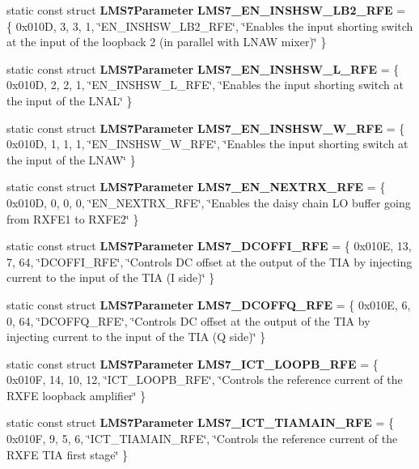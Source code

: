 \begin{DoxyCompactItemize}
static const struct {\bf L\+M\+S7\+Parameter} {\bf L\+M\+S7\+\_\+\+E\+N\+\_\+\+I\+N\+S\+H\+S\+W\+\_\+\+L\+B2\+\_\+\+R\+FE} = \{ 0x010\+D, 3, 3, 1, \char`\"{}\+E\+N\+\_\+\+I\+N\+S\+H\+S\+W\+\_\+\+L\+B2\+\_\+\+R\+F\+E\char`\"{}, \char`\"{}\+Enables the input shorting switch at the input of the loopback 2 (in parallel with L\+N\+A\+W mixer)\char`\"{} \}
\item 
static const struct {\bf L\+M\+S7\+Parameter} {\bf L\+M\+S7\+\_\+\+E\+N\+\_\+\+I\+N\+S\+H\+S\+W\+\_\+\+L\+\_\+\+R\+FE} = \{ 0x010\+D, 2, 2, 1, \char`\"{}\+E\+N\+\_\+\+I\+N\+S\+H\+S\+W\+\_\+\+L\+\_\+\+R\+F\+E\char`\"{}, \char`\"{}\+Enables the input shorting switch at the input of the L\+N\+A\+L\char`\"{} \}
\item 
static const struct {\bf L\+M\+S7\+Parameter} {\bf L\+M\+S7\+\_\+\+E\+N\+\_\+\+I\+N\+S\+H\+S\+W\+\_\+\+W\+\_\+\+R\+FE} = \{ 0x010\+D, 1, 1, 1, \char`\"{}\+E\+N\+\_\+\+I\+N\+S\+H\+S\+W\+\_\+\+W\+\_\+\+R\+F\+E\char`\"{}, \char`\"{}\+Enables the input shorting switch at the input of the L\+N\+A\+W\char`\"{} \}
\item 
static const struct {\bf L\+M\+S7\+Parameter} {\bf L\+M\+S7\+\_\+\+E\+N\+\_\+\+N\+E\+X\+T\+R\+X\+\_\+\+R\+FE} = \{ 0x010\+D, 0, 0, 0, \char`\"{}\+E\+N\+\_\+\+N\+E\+X\+T\+R\+X\+\_\+\+R\+F\+E\char`\"{}, \char`\"{}\+Enables the daisy chain L\+O buffer going from R\+X\+F\+E1 to R\+X\+F\+E2\char`\"{} \}
\item 
static const struct {\bf L\+M\+S7\+Parameter} {\bf L\+M\+S7\+\_\+\+D\+C\+O\+F\+F\+I\+\_\+\+R\+FE} = \{ 0x010\+E, 13, 7, 64, \char`\"{}\+D\+C\+O\+F\+F\+I\+\_\+\+R\+F\+E\char`\"{}, \char`\"{}\+Controls D\+C offset at the output of the T\+I\+A by injecting current to the input of the T\+I\+A (\+I side)\char`\"{} \}
\item 
static const struct {\bf L\+M\+S7\+Parameter} {\bf L\+M\+S7\+\_\+\+D\+C\+O\+F\+F\+Q\+\_\+\+R\+FE} = \{ 0x010\+E, 6, 0, 64, \char`\"{}\+D\+C\+O\+F\+F\+Q\+\_\+\+R\+F\+E\char`\"{}, \char`\"{}\+Controls D\+C offset at the output of the T\+I\+A by injecting current to the input of the T\+I\+A (\+Q side)\char`\"{} \}
\item 
static const struct {\bf L\+M\+S7\+Parameter} {\bf L\+M\+S7\+\_\+\+I\+C\+T\+\_\+\+L\+O\+O\+P\+B\+\_\+\+R\+FE} = \{ 0x010\+F, 14, 10, 12, \char`\"{}\+I\+C\+T\+\_\+\+L\+O\+O\+P\+B\+\_\+\+R\+F\+E\char`\"{}, \char`\"{}\+Controls the reference current of the R\+X\+F\+E loopback amplifier\char`\"{} \}
\item 
static const struct {\bf L\+M\+S7\+Parameter} {\bf L\+M\+S7\+\_\+\+I\+C\+T\+\_\+\+T\+I\+A\+M\+A\+I\+N\+\_\+\+R\+FE} = \{ 0x010\+F, 9, 5, 6, \char`\"{}\+I\+C\+T\+\_\+\+T\+I\+A\+M\+A\+I\+N\+\_\+\+R\+F\+E\char`\"{}, \char`\"{}\+Controls the reference current of the R\+X\+F\+E T\+I\+A first stage\char`\"{} \}

\end{DoxyCompactItemize}
